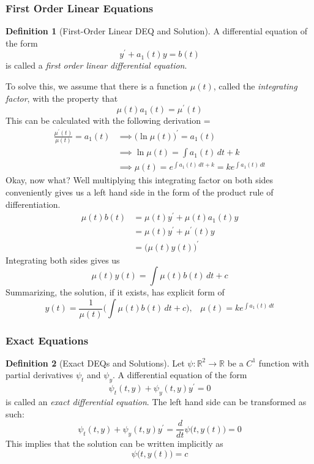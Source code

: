 \documentclass{article}
\theoremstyle{remark}
\theoremstyle{definition}
\newtheorem{definition}{Definition}[section]
\begin{document}
    \subsubsection{First Order Linear Equations}

      \begin{definition}[First-Order Linear DEQ and Solution]
      A differential equation of the form 
      \[y^\prime + a_1 (t) y = b(t)\]
      is called a \textit{first order linear differential equation}. 

      To solve this, we assume that there is a function $\mu (t)$, called the \textit{integrating factor}, with the property that 
      \[\mu(t) a_1 (t) = \mu^\prime (t)\]
      This can be calculated with the following derivation =
      \begin{align*}
          \frac{\mu^\prime (t)}{\mu (t)} = a_1 (t) & \implies \big( \ln{\mu(t)}\big)^\prime = a_1 (t) \\
          & \implies \ln{\mu(t)} = \int a_1 (t) \, dt + k \\
          & \implies \mu(t) = e^{\int a_1(t)\,dt + k} = k e^{\int a_1 (t) \,dt}
      \end{align*}
      Okay, now what? Well multiplying this integrating factor on both sides conveniently gives us a left hand side in the form of the product rule of differentiation. 
      \begin{align*}
           \mu(t) b(t) & = \mu(t) y^\prime + \mu(t) a_1 (t) y \\
           & = \mu(t) y^\prime + \mu^\prime (t) y \\
           & = \big( \mu(t) y(t) \big)^\prime
      \end{align*}
      Integrating both sides gives us 
      \[\mu(t) y(t) = \int \mu(t) b(t) \,dt + c\]
      Summarizing, the solution, if it exists, has explicit form of
      \[y(t) = \frac{1}{\mu(t)} \bigg(\int \mu(t) b(t) \,dt + c\bigg), \;\;\; \mu(t) = k e^{\int a_1 (t)\,dt}\]
      \end{definition}

    \subsubsection{Exact Equations}

      \begin{definition}[Exact DEQs and Solutions]
      Let $\psi: \mathbb{R}^2 \longrightarrow \mathbb{R}$ be a $C^1$ function with partial derivatives $\psi_t$ and $\psi_y$. A differential equation of the form 
      \[\psi_t (t, y) + \psi_y (t, y) y^\prime = 0\]
      is called an \textit{exact differential equation}. The left hand side can be transformed as such: 
      \[\psi_t (t, y) + \psi_y (t, y) y^\prime = \frac{d}{dt} \psi \big( t, y(t)\big) = 0\]
      This implies that the solution can be written implicitly as 
      \[\psi \big(t, y(t)\big) = c\]
      \end{definition}
\end{document}
